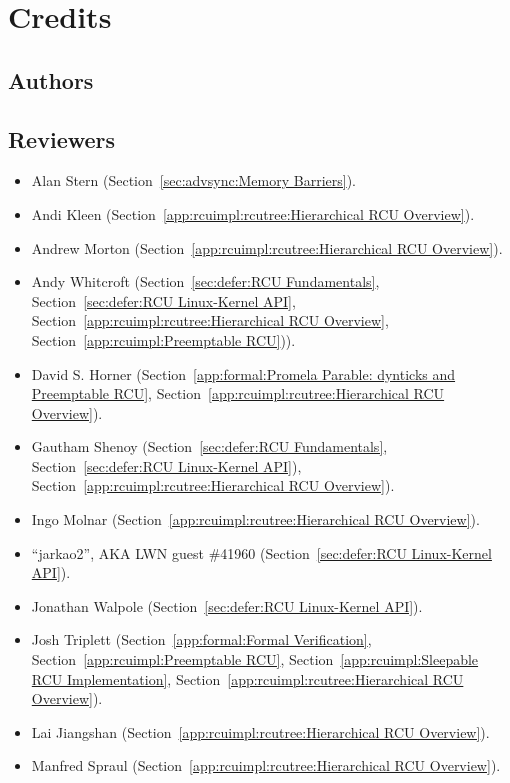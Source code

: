 
\chapter{Credits}
\label{app:ack:Credits}

\section{Authors}

\section{Reviewers}

\begin{itemize}
\item	Alan Stern (Section~\ref{sec:advsync:Memory Barriers}).
\item	Andi Kleen (Section~\ref{app:rcuimpl:rcutree:Hierarchical RCU Overview}).
\item	Andrew Morton (Section~\ref{app:rcuimpl:rcutree:Hierarchical RCU Overview}).
\item	Andy Whitcroft (Section~\ref{sec:defer:RCU Fundamentals},
	Section~\ref{sec:defer:RCU Linux-Kernel API},
	Section~\ref{app:rcuimpl:rcutree:Hierarchical RCU Overview},
	Section~\ref{app:rcuimpl:Preemptable RCU})).
\item	David S. Horner
	(Section~\ref{app:formal:Promela Parable: dynticks and Preemptable RCU},
	Section~\ref{app:rcuimpl:rcutree:Hierarchical RCU Overview}).
\item	Gautham Shenoy (Section~\ref{sec:defer:RCU Fundamentals},
	Section~\ref{sec:defer:RCU Linux-Kernel API}),
	Section~\ref{app:rcuimpl:rcutree:Hierarchical RCU Overview}).
\item	Ingo Molnar (Section~\ref{app:rcuimpl:rcutree:Hierarchical RCU Overview}).
\item	``jarkao2'', AKA LWN guest \#41960 (Section~\ref{sec:defer:RCU Linux-Kernel API}).
\item	Jonathan Walpole (Section~\ref{sec:defer:RCU Linux-Kernel API}).
\item	Josh Triplett
	(Section~\ref{app:formal:Formal Verification},
	Section~\ref{app:rcuimpl:Preemptable RCU},
	Section~\ref{app:rcuimpl:Sleepable RCU Implementation},
	Section~\ref{app:rcuimpl:rcutree:Hierarchical RCU Overview}).
\item	Lai Jiangshan (Section~\ref{app:rcuimpl:rcutree:Hierarchical RCU Overview}).
\item	Manfred Spraul (Section~\ref{app:rcuimpl:rcutree:Hierarchical RCU Overview}).

\end{itemize}
